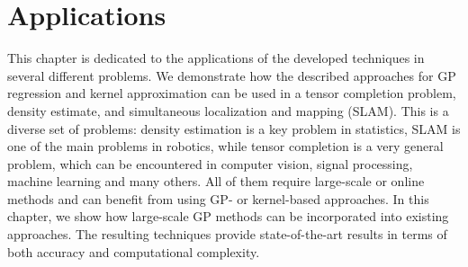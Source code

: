 \chapter{Applications}
\label{chap:applications}

This chapter is dedicated to the applications of the developed techniques
in several different problems.
We demonstrate how the described approaches for GP regression
and kernel approximation can be used in a tensor completion
problem,
density estimate, and simultaneous localization and mapping (SLAM).
This is a diverse set of problems: density estimation is a key problem
in statistics, SLAM is one of the main problems in robotics,
while tensor completion is a very general problem, which can be encountered
in computer vision, signal processing, machine learning and many others.
All of them require large-scale or online methods and can benefit
from using GP- or kernel-based approaches.
In this chapter, we show how large-scale GP methods can be incorporated into
existing approaches.
The resulting techniques provide state-of-the-art results in terms of both
accuracy and computational complexity.

